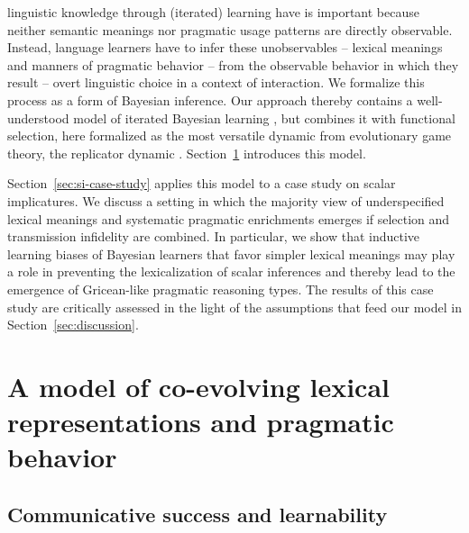 \documentclass[a4paper, 11pt]{article}
\theoremstyle{Satz}
\begin{document}
linguistic knowledge through (iterated) learning have is important because neither semantic meanings nor pragmatic usage
patterns are directly observable. Instead, language learners have to infer these unobservables -- lexical meanings and manners of pragmatic behavior --
from the observable behavior in which they result -- overt linguistic choice in a context of interaction. We formalize this process as a form of
Bayesian inference. Our approach thereby contains a well-understood model of
iterated Bayesian learning \citep{griffiths+kalish:2005,griffiths+kalish:2007}, but combines it with functional
selection, here formalized as the most versatile dynamic from evolutionary game theory, the
replicator dynamic \citep{TaylorJonker1978:Evolutionary-St}. Section~\ref{sec:model} introduces
this model.

Section~\ref{sec:si-case-study} applies this model to a case study on scalar implicatures. We
discuss a setting in which the majority view of underspecified lexical meanings and systematic pragmatic
enrichments emerges if selection and transmission infidelity are combined. In particular, we
show that inductive learning biases of Bayesian learners that favor simpler lexical meanings
may play a role in preventing the lexicalization of scalar inferences and thereby lead to the emergence of Gricean-like
pragmatic reasoning types. The results of this case study are critically assessed in the light of
the assumptions that feed our model in Section~\ref{sec:discussion}.


\section{A model of co-evolving lexical representations and pragmatic behavior}
\label{sec:model}

\subsection{Communicative success and learnability}
\end{document}
